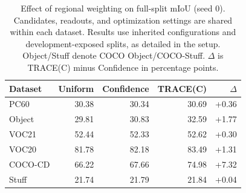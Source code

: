\begin{table}[t]
\caption{Effect of regional weighting on full-split mIoU (seed 0). Candidates, readouts, and optimization settings are shared within each dataset. Results use inherited configurations and development-exposed splits, as detailed in the setup. Object/Stuff denote COCO Object/COCO-Stuff. $\Delta$ is TRACE(C) minus Confidence in percentage points.}
\label{tab:image-full-comparison}
\centering\small\setlength{\tabcolsep}{4pt}
\begin{tabular}{@{}lrrrr@{}}
\toprule
Dataset & Uniform & Confidence & TRACE(C) & $\Delta$ \\
\midrule
PC60 & 30.38 & 30.34 & 30.69 & +0.36 \\
Object & 29.81 & 30.83 & 32.59 & +1.77 \\
VOC21 & 52.44 & 52.33 & 52.62 & +0.30 \\
VOC20 & 81.78 & 82.18 & 83.49 & +1.31 \\
COCO-CD & 66.22 & 67.66 & 74.98 & +7.32 \\
Stuff & 21.74 & 21.79 & 21.84 & +0.04 \\
\bottomrule
\end{tabular}
\end{table}
